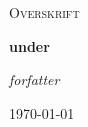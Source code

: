 \documentclass[a4paper, oneside, norsk, 10pt]{article} %
\newcommand{\1}{\mathbbm{1}}
\begin{document}
	\begin{titlepage}
		\centering
		{\scshape\LARGE Overskrift \par}
		\vspace{1cm}
		{\huge\bfseries under	 \par}
		\vspace{2cm}
		{\Large\itshape forfatter} 
		
		\vfill
		
		{\large \today\par}
	\end{titlepage}
\end{document}
